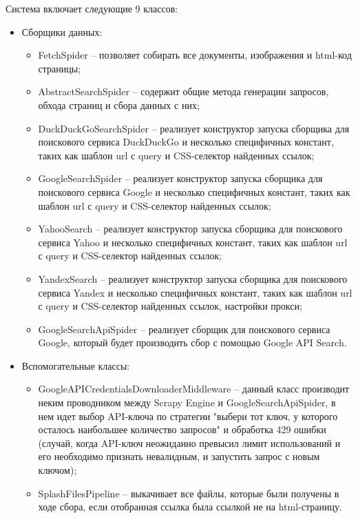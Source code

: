 Система включает следующие 9 классов:
\begin{itemize}
    \item Сборщики данных:
    \begin{itemize}
        \item FetchSpider -- позволяет собирать все документы, изображения и html-код страницы;  
        \item AbstractSearchSpider -- содержит общие метода генерации запросов, обхода страниц и сбора данных с них;
        \item DuckDuckGoSearchSpider -- реализует конструктор запуска сборщика для поискового сервиса DuckDuckGo и несколько 
        специфичных констант, таких как шаблон url с query и CSS-селектор найденных ссылок;
        \item GoogleSearchSpider -- реализует конструктор запуска сборщика для поискового сервиса Google и несколько 
        специфичных констант, таких как шаблон url с query и CSS-селектор найденных ссылок;
        \item YahooSearch -- реализует конструктор запуска сборщика для поискового сервиса Yahoo и несколько 
        специфичных констант, таких как шаблон url с query и CSS-селектор найденных ссылок;
        \item YandexSearch -- реализует конструктор запуска сборщика для поискового сервиса Yandex и несколько 
        специфичных констант, таких как шаблон url с query и CSS-селектор найденных ссылок, настройки прокси;
        \item GoogleSearchApiSpider -- реализует сборщик для поискового сервиса Google, который будет
        производить сбор с помощью Google API Search.
    \end{itemize}
    \item Вспомогательные классы:
    \begin{itemize}
        \item GoogleAPICredentialsDownloaderMiddleware -- данный класс производит неким проводником между Scrapy Engine и 
        GoogleSearchApiSpider, в нем идет выбор API-ключа по стратегии "выбери тот ключ, у которого осталось 
        наибольшее количество запросов" и обработка 429 ошибки (случай, когда API-ключ неожиданно превысил лимит 
        использований и его необходимо признать невалидным, и запустить запрос с новым ключом);
        \item SplashFilesPipeline -- выкачивает все файлы, которые были получены в ходе сбора, если отобранная 
        ссылка была ссылкой не на html-страницу. 
    \end{itemize}
\end{itemize}


